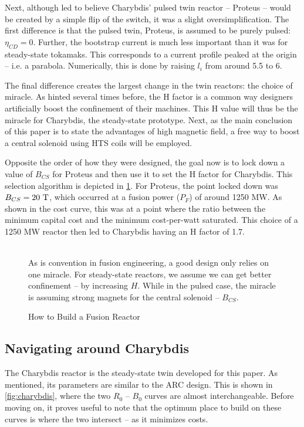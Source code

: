 Next, although led to believe Charybdis' pulsed twin reactor -- Proteus -- would be created by a simple flip of the switch, it was a slight oversimplification. The first difference is that the pulsed twin, Proteus, is assumed to be purely pulsed: $\eta_{CD} = 0$. Further, the bootstrap current is much less important than it was for steady-state tokamaks. This corresponds to a current profile peaked at the origin -- i.e. a parabola. Numerically, this is done by raising $l_i$ from around 5.5 to 6.

The final difference creates the largest change in the twin reactors: the choice of miracle. As hinted several times before, the H factor is a common way designers artificially boost the confinement of their machines. This H value will thus be the miracle for Charybdis, the steady-state prototype. Next, as the main conclusion of this paper is to state the advantages of high magnetic field, a free way to boost a central solenoid using HTS coils will be employed.

Opposite the order of how they were designed, the goal now is to lock down a value of $B_{CS}$ for Proteus and then use it to set the H factor for Charybdis. This selection algorithm is depicted in \cref{fig:selection}. For Proteus, the point locked down was $B_{CS} = 20 \ \textnormal{T}$, which occurred at a fusion power ($P_F$) of around 1250 MW. As shown in the cost curve, this was at a point where the ratio between the minimum capital cost and the minimum cost-per-watt saturated. This choice of a 1250 MW reactor then led to Charybdis having an H factor of 1.7.

\begin{figure}[h!]
\centering

\caption{How to Build a Fusion Reactor} ~ \\
\small As is convention in fusion engineering, a good design only relies on one miracle. For steady-state reactors, we assume we can get better confinement -- by increasing $H$. While in the pulsed case, the miracle is assuming strong magnets for the central solenoid -- $B_{CS}$.
\label{fig:selection}
\end{figure}

\clearpage

\newpage

\subsection{Navigating around Charybdis}

The Charybdis reactor is the steady-state twin developed for this paper. As mentioned, its parameters are similar to the ARC design. This is shown in \cref{fig:charybdis}, where the two $R_0$ -- $B_0$ curves are almost interchangeable. Before moving on, it proves useful to note that the optimum place to build on these curves is where the two intersect -- as it minimizes costs.

